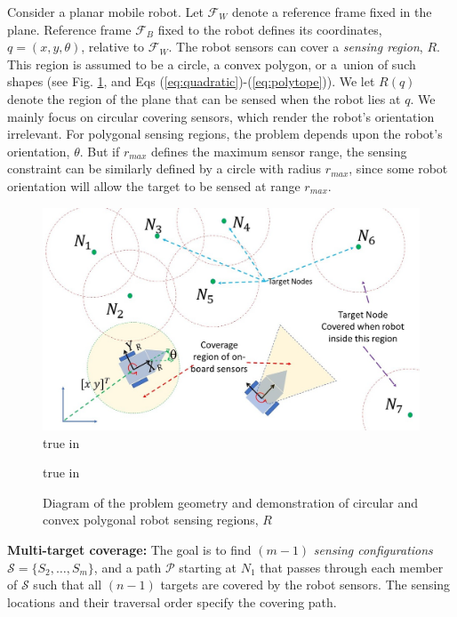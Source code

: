 \documentclass[letterpaper, 10 pt, conference]{ieeeconf}
\theoremstyle{definition}
\newcommand{\Ps}{\mathcal{P}}
\newcommand{\Ss}{\mathcal{S}}
\begin{document}
\noindent Consider a planar mobile robot.  Let $\mathcal{F}_W$ denote a reference frame fixed in the plane. Reference frame $\mathcal{F}_B$ fixed to the robot defines its coordinates, $q=(x,y,\theta)$, relative to $\mathcal{F}_W$.  The robot sensors can cover a {\em sensing region}, $R$.  This region is assumed to be a circle, a convex polygon, or %
a~union of such shapes (see Fig. \ref{fig:sensing_region}, and Eqs (\ref{eq:quadratic})-(\ref{eq:polytope})).  We let $R(q)$ denote the region of the plane that can be sensed when the robot lies at $q$.  We mainly focus on circular covering sensors, which render the robot's orientation irrelevant.  For polygonal sensing regions, the problem depends upon the robot's orientation, $\theta$. But if $r_{max}$ defines the maximum sensor range, the sensing constraint can be similarly defined by a circle with radius $r_{max}$, since some robot orientation will allow the target to be sensed at range $r_{max}$.
%
\begin{figure}
  \includegraphics[height=1.8 true in]{ProblemGeometry.jpg}
   true in
  \caption{Diagram of the problem geometry and demonstration of circular and convex polygonal
    robot sensing regions, $R$}
  \label{fig:sensing_region}
     true in
\end{figure}

{\bf Multi-target coverage:} The goal is to find $(m-1)$ {\em sensing configurations} $\mathcal{S} =\{S_2,\ldots,S_m\}$, and a path $\Ps$ starting at $N_1$ that passes through each member of $\Ss$ such that all $(n-1)$ targets are covered by the robot sensors. The sensing locations and their traversal order specify the covering path.
\end{document}

